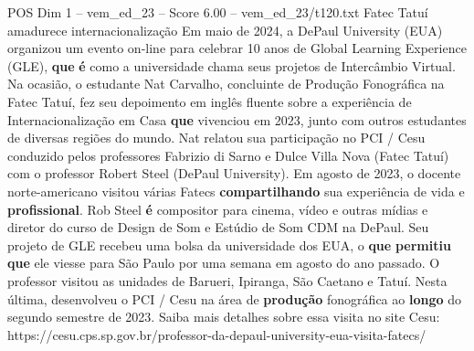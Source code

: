 \begin{textsample}{POS Dim 1 – vem\_ed\_23 – Score 6.00 – vem\_ed\_23/t120.txt}  \label{ex:f1_pos_144}
Fatec Tatuí amadurece internacionalização Em maio de 2024, a DePaul University (EUA) organizou um evento on-line para celebrar 10 anos de Global Learning Experience (GLE), \textbf{que} \textbf{é} como a universidade chama seus projetos de Intercâmbio Virtual.
Na ocasião, o estudante Nat Carvalho, concluinte de Produção Fonográfica na Fatec Tatuí, fez seu depoimento em inglês fluente sobre a experiência de Internacionalização em Casa \textbf{que} vivenciou em 2023, junto com outros estudantes de diversas regiões do mundo.
Nat relatou sua participação no PCI / Cesu conduzido pelos professores Fabrizio di Sarno e Dulce Villa Nova (Fatec Tatuí) com o professor Robert Steel (DePaul University).
Em agosto de 2023, o docente norte-americano visitou várias Fatecs \textbf{compartilhando} sua experiência de vida e \textbf{profissional}.
Rob Steel \textbf{é} compositor para cinema, vídeo e outras mídias e diretor do curso de Design de Som e Estúdio de Som CDM na DePaul.
Seu projeto de GLE recebeu uma bolsa da universidade dos EUA, o \textbf{que} \textbf{permitiu} \textbf{que} ele viesse para São Paulo por uma semana em agosto do ano passado.
O professor visitou as unidades de Barueri, Ipiranga, São Caetano e Tatuí.
Nesta última, desenvolveu o PCI / Cesu na área de \textbf{produção} fonográfica ao \textbf{longo} do segundo semestre de 2023.
Saiba mais detalhes sobre essa visita no site Cesu: https://cesu.cps.sp.gov.br/professor-da-depaul-university-eua-visita-fatecs/

\end{textsample}
